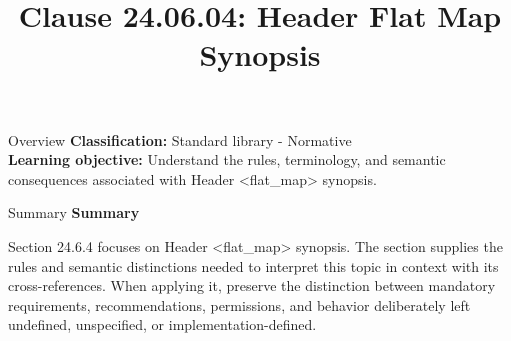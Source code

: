 \documentclass[10pt,letterpaper]{article}
\title{Clause 24.06.04: Header Flat Map Synopsis}
\author{}
\date{}
\begin{document}
\maketitle
\begin{CornellOverviewBox}{Overview}
\textbf{Classification:} Standard library - Normative\\[2pt]
\textbf{Learning objective:} Understand the rules, terminology, and semantic consequences associated with Header <flat\_map> synopsis.
\end{CornellOverviewBox}\begin{CornellSummaryBox}{Summary}
{\sffamily\bfseries\color{Accent} Summary}\par\vspace{3pt}Section 24.6.4 focuses on Header <flat\_map> synopsis. The section supplies the rules and semantic distinctions needed to interpret this topic in context with its cross-references. When applying it, preserve the distinction between mandatory requirements, recommendations, permissions, and behavior deliberately left undefined, unspecified, or implementation-defined.
\end{CornellSummaryBox}
\end{document}
